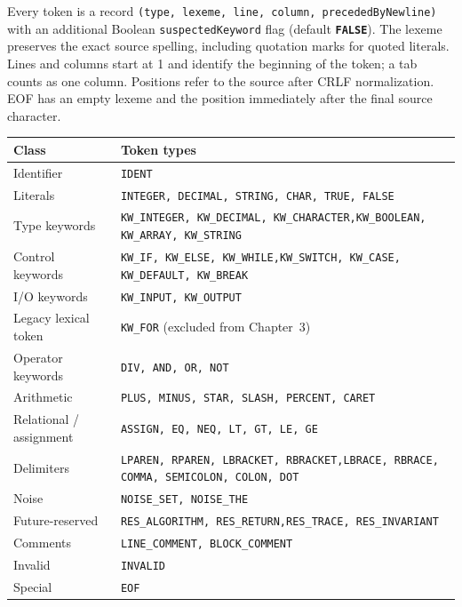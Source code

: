 \documentclass[11pt,a4paper]{article}
\newcommand{\kw}[1]{\texttt{\bfseries\color{pupmaroon}#1}}
\newcommand{\token}[1]{\texttt{#1}}
\newcommand{\codeinline}[1]{\texttt{#1}}
\begin{document}
Every token is a record \codeinline{(type, lexeme, line, column, precededByNewline)} with an additional Boolean \codeinline{suspectedKeyword} flag (default \kw{FALSE}). The lexeme preserves the exact source spelling, including quotation marks for quoted literals. Lines and columns start at 1 and identify the beginning of the token; a tab counts as one column. Positions refer to the source after CRLF normalization. EOF has an empty lexeme and the position immediately after the final source character.

\begin{table}[H]
\centering\small
\begin{tabularx}{\linewidth}{L{32mm} Y}
\toprule
\textbf{Class} & \textbf{Token types} \\
\midrule
Identifier & \token{IDENT} \\
Literals & \token{INTEGER, DECIMAL, STRING, CHAR, TRUE, FALSE} \\
Type keywords & \token{KW\_INTEGER, KW\_DECIMAL, KW\_CHARACTER,}\newline\token{KW\_BOOLEAN, KW\_ARRAY, KW\_STRING} \\
Control keywords & \token{KW\_IF, KW\_ELSE, KW\_WHILE,}\newline\token{KW\_SWITCH, KW\_CASE, KW\_DEFAULT, KW\_BREAK} \\
I/O keywords & \token{KW\_INPUT, KW\_OUTPUT} \\
Legacy lexical token & \token{KW\_FOR} (excluded from Chapter~3) \\
Operator keywords & \token{DIV, AND, OR, NOT} \\
Arithmetic & \token{PLUS, MINUS, STAR, SLASH, PERCENT, CARET} \\
Relational / assignment & \token{ASSIGN, EQ, NEQ, LT, GT, LE, GE} \\
Delimiters & \token{LPAREN, RPAREN, LBRACKET, RBRACKET,}\newline\token{LBRACE, RBRACE, COMMA, SEMICOLON, COLON, DOT} \\
Noise & \token{NOISE\_SET, NOISE\_THE} \\
Future-reserved & \token{RES\_ALGORITHM, RES\_RETURN,}\newline\token{RES\_TRACE, RES\_INVARIANT} \\
Comments & \token{LINE\_COMMENT, BLOCK\_COMMENT} \\
Invalid & \token{INVALID} \\
Special & \token{EOF} \\
\bottomrule
\end{tabularx}
\end{table}
\end{document}
